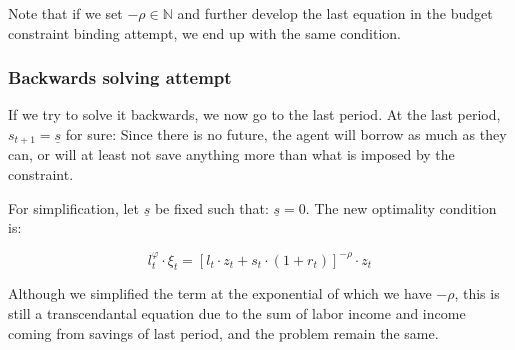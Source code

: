 \documentclass{article}
\begin{document}
Note that if we set $-\rho\in\mathbb{N}$ and further develop the last equation in the 
budget constraint binding attempt, we end up with the same condition.

\subsubsection{Backwards solving attempt}

If we try to solve it backwards, we now go to the last period. 
At the last period, $s_{t+1} = \underline{s}$ for sure:
Since there is no future, 
the agent will borrow as much as they can,
or will at least not save anything more than what is imposed 
by the constraint. 

For simplification, let $\underline{s}$ be fixed such that: $\underline{s} = 0$.
The new optimality condition is: 

\begin{equation}
    l_{t}^{\varphi}\cdot \xi_{t} = \left[l_{t}\cdot z_{t} + s_{t}\cdot(1+r_{t})\right]^{-\rho}\cdot z_{t}
\end{equation}

Although we simplified the term at the exponential of which 
we have $-\rho$, this is still a transcendantal equation due to the sum 
of labor income and income coming from savings of last period, and the problem remain the same.
\end{document}
